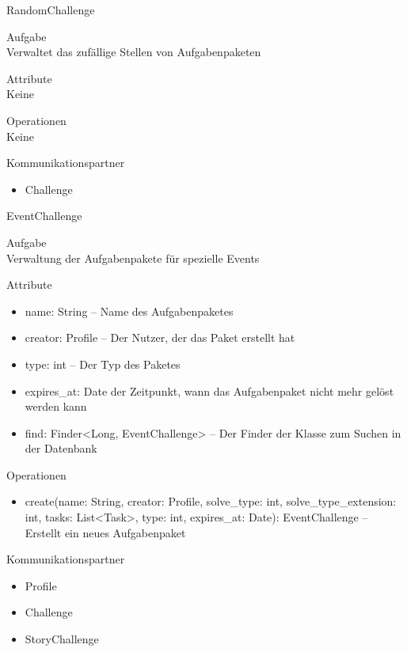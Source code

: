 \newpage
\begin{class}{30}{RandomChallenge}
\item[Aufgabe]~\\
Verwaltet das zufällige Stellen von Aufgabenpaketen
\item[Attribute]~\\
Keine
\item[Operationen]~\\
Keine
\item[Kommunikationspartner]~\\
\begin{itemize}
\item Challenge
\end{itemize}
\end{class}

\newpage
\begin{class}{40}{EventChallenge}
\item[Aufgabe]~\\
Verwaltung der Aufgabenpakete für spezielle Events
\item[Attribute]~\\
\begin{itemize}
\item name: String -- Name des Aufgabenpaketes
\item creator: Profile -- Der Nutzer, der das Paket erstellt hat
\item type: int -- Der Typ des Paketes
\item expires\_at: Date der Zeitpunkt, wann das Aufgabenpaket nicht mehr gelöst werden kann
\item find: Finder<Long, EventChallenge> -- Der Finder der Klasse zum Suchen in der Datenbank
\end{itemize}
\item[Operationen]~\\
\begin{itemize}
\item create(name: String, creator: Profile, solve\_type: int, solve\_type\_extension: int, tasks: List<Task>, type: int, expires\_at: Date): EventChallenge -- Erstellt ein neues Aufgabenpaket
\end{itemize}
\item[Kommunikationspartner]~\\
\begin{itemize}
\item Profile
\item Challenge
\item StoryChallenge
\end{itemize}
\end{class}

